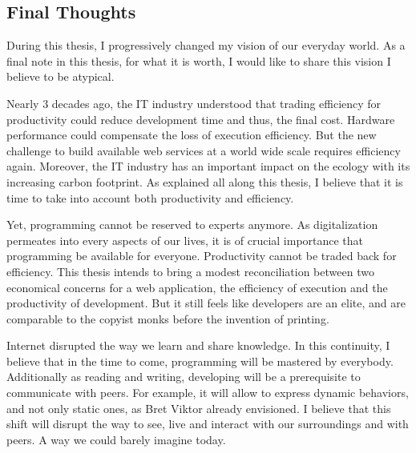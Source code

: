 

\subsection{Final Thoughts}

During this thesis, I progressively changed my vision of our everyday world.
As a final note in this thesis, for what it is worth, I would like to share this vision I believe to be atypical.


Nearly 3 decades ago, the IT industry understood that trading efficiency for productivity could reduce development time and thus, the final cost.
Hardware performance could compensate the loss of execution efficiency.
But the new challenge to build available web services at a world wide scale requires efficiency again.
Moreover, the IT industry has an important impact on the ecology with its increasing carbon footprint.
As explained all along this thesis, I believe that it is time to take into account both productivity and efficiency.

Yet, programming cannot be reserved to experts anymore.
As digitalization permeates into every aspects of our lives, it is of crucial importance that programming be available for everyone.
Productivity cannot be traded back for efficiency.
This thesis intends to bring a modest reconciliation between two economical concerns for a web application, the efficiency of execution and the productivity of development.
But it still feels like developers are an elite, and are comparable to the copyist monks before the invention of printing.

Internet disrupted the way we learn and share knowledge.
In this continuity, I believe that in the time to come, programming will be mastered by everybody.
Additionally as reading and writing, developing will be a prerequisite to communicate with peers.
For example, it will allow to express dynamic behaviors, and not only static ones, as Bret Viktor already envisioned.
I believe that this shift will disrupt the way to see, live and interact with our surroundings and with peers.
A way we could barely imagine today.


